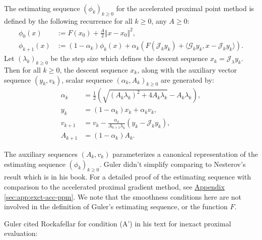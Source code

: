 \documentclass[12pt]{article}
\begin{document}
    \begin{definition}\label{def:nes-est-seq-acc-ppm}
        \; \\
        The estimating sequence  $(\phi_k)_{k \ge0}$ for the accelerated proximal point method is defined by the following recurrence for all $k \ge0$, any $A \ge 0$: 
        \begin{align*}
            \phi_0(x) &:= F(x_0) + \frac{A}{2}\Vert x - x_0\Vert^2, 
            \\
            \phi_{k + 1}(x) &:= 
            (1 - \alpha_k)\phi_k(x)
            + 
            \alpha_k(F(\mathcal J_k y_k) + \langle \mathcal G_k y_k, x - \mathcal J_k y_k\rangle).    
        \end{align*}
        Let $(\lambda_k)_{k \ge 0}$ be the step size which defines the descent sequence $x_k = \mathcal J_\lambda y_k$. 
        Then for all $k \ge 0$, the descent sequence $x_k$, along with the auxiliary vector sequence $(y_k, v_k)$, scalar sequence $(\alpha_k, A_k)_{k\ge 0}$ are generated by: 
        \begin{align*}
            \alpha_k &= \frac{1}{2}\left(
                \sqrt{(A_k\lambda_k)^2 + 4A_k \lambda_k}
                - A_k\lambda_k
            \right), 
            \\
            y_k &= (1 - \alpha_k)x_k + \alpha_k v_k, 
            \\
            v_{k + 1}
            &= 
            v_k - \frac{\alpha_k}{A_{k + 1}\lambda_k}(y_k - \mathcal J_k y_k), 
            \\
            A_{k + 1} &= (1 - \alpha_k)A_k. 
        \end{align*}
    \end{definition}
    \begin{remark}
        The auxiliary sequences $(A_k, v_k)$ parameterizes a canonical representation of the estimating sequence $(\phi_k)_{k \ge0}$. 
        Guler didn't simplify comparing to Nesterov's result which is in his book. 
        For a detailed proof of the estimating sequence with comparison to the accelerated proximal gradient method, see 
        \hyperref[sec:app:exct-acc-ppm]{Appendix \ref*{sec:app:exct-acc-ppm}}. 
        We note that the smoothness conditions here are not involved in the definition of Guler's estimating sequence, or the function $F$. 
    \end{remark}
    Guler cited Rockafellar \cite{rockafellar_monotone_1976} for condition (A') in his text for inexact proximal evaluation: 
\end{document}
